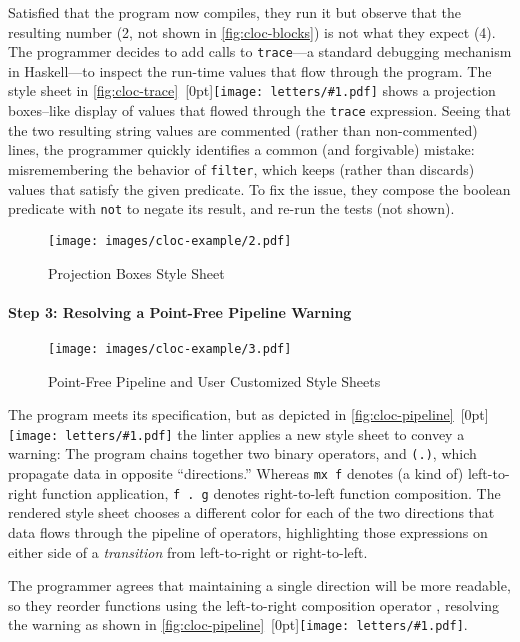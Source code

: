 \documentclass[acmsmall, screen]{acmart}
\newcommand{\parahead}[1]
  {\paragraph{\textbf{#1}}}
\newcommand{\figBubble}[1]{\raisebox{-0.03in}[0pt]{\texttt{[image: letters/\#1.pdf]}}}
\newcommand{\refBubble}[1]
  {~\figBubble{#1}}
\begin{document}
Satisfied that the program now compiles, they run it but observe that the resulting number (2, not shown in \autoref{fig:cloc-blocks}) is not what they expect (4).
The programmer decides to add calls to \texttt{trace}---a standard debugging mechanism in Haskell---to inspect the run-time values that flow through the program.
The style sheet in \autoref{fig:cloc-trace}\refBubble{e} shows a projection boxes--like display \cite{Lerner2020} of values that flowed through the \texttt{trace} expression.
Seeing that the two resulting string values are commented (rather than non-commented) lines, the programmer quickly identifies a common (and forgivable) mistake:
misremembering the behavior of \texttt{filter}, which keeps (rather than discards) values that satisfy the given predicate.
To fix the issue, they compose the boolean predicate with \texttt{not} to negate its result, and re-run the tests (not shown).


\begin{figure}[h]
  \texttt{[image: images/cloc-example/2.pdf]}
  \caption{Projection Boxes Style Sheet}
  \label{fig:cloc-trace}
\end{figure}
 

\parahead{Step 3: Resolving a Point-Free Pipeline Warning}


\begin{wrapfigure}[23]{r}{2.2in}
  \vspace{-0.09in}
  \texttt{[image: images/cloc-example/3.pdf]}
  \caption{Point-Free Pipeline and User Customized Style Sheets}
  \label{fig:cloc-pipeline}
\end{wrapfigure}
 
The program meets its specification, but as depicted in \autoref{fig:cloc-pipeline}\refBubble{f} the linter applies a new style sheet to convey a warning: The program chains
together two binary operators, \prefixOp{\bindOp} and \texttt{(.)}, which propagate data in opposite ``directions.''
Whereas \mbox{\texttt{mx \bindOp{} f}} denotes (a kind of) left-to-right function application, \mbox{\texttt{f . g}} denotes right-to-left function composition.
The rendered style sheet chooses a different color for each of the two directions that data flows through the pipeline of operators, highlighting those expressions on either side of a \emph{transition} from left-to-right or right-to-left.

The programmer agrees that maintaining a single direction will be more readable, so they reorder functions using the left-to-right composition operator \prefixOp{\lrComposeOp}, resolving the warning as shown in \autoref{fig:cloc-pipeline}\refBubble{g}.
\end{document}
